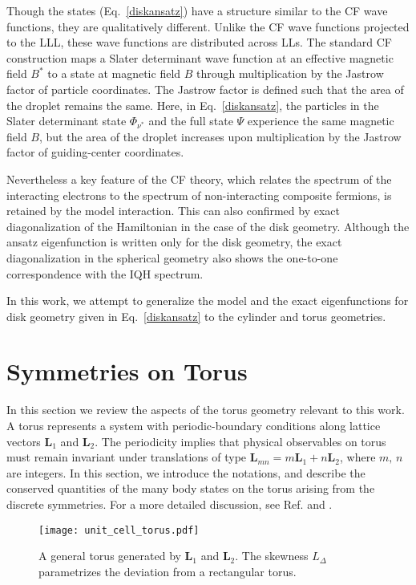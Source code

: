 \documentclass[prb,aps,epsfig,longbibliography,twocolumn]{revtex4-1}
\newcommand{\bsym}[1]{\boldsymbol{#1}}
\begin{document}
Though the states (Eq.~\ref{diskansatz}) have a structure similar to the CF wave functions, they are qualitatively different. Unlike the CF wave functions projected to the LLL, these wave functions are distributed across LLs. The standard CF construction maps a Slater determinant wave function at an effective magnetic field $B^*$ to a state at magnetic field $B$ through multiplication by the Jastrow factor of particle coordinates. The Jastrow factor is defined such that the area of the droplet remains the same. Here, in Eq.~\ref{diskansatz}, the particles in the Slater determinant state $\Phi_{\nu^*}$ and the full state $\Psi$ experience the same magnetic field $B$, but the area of the droplet increases upon multiplication by the Jastrow factor of guiding-center coordinates. 

Nevertheless a key feature of the CF theory, which relates the spectrum of the interacting electrons to the spectrum of non-interacting composite fermions, is retained by the model interaction. This can also confirmed by exact diagonalization of the Hamiltonian in the case of the disk geometry. Although the ansatz eigenfunction is written only for the disk geometry, the exact diagonalization in the spherical geometry also shows the one-to-one correspondence with the IQH spectrum. 

In this work, we attempt to generalize the model and the exact eigenfunctions for disk geometry given in Eq.~\eqref{diskansatz} to the cylinder and torus geometries. 

\section{Symmetries on Torus} \label{SecSymTorus}
In this section we review the aspects of the torus geometry relevant to this work.
A torus represents a system with periodic-boundary conditions along lattice vectors $\bsym{L}_1$ and $\bsym{L}_2$. The periodicity implies that physical observables on torus must remain invariant under translations of type $\bsym{L}_{mn}= m\bsym{L}_1 + n\bsym{L}_2$, where $m,\,n$ are integers. 
In this section, we introduce the notations, and describe the conserved quantities of the many body states on the torus arising from the discrete symmetries. For a more detailed discussion, see Ref.  and .
\begin{figure}[h]
\texttt{[image: unit\_cell\_torus.pdf]}
\caption{
A general torus generated by $\bsym{L}_1$ and $\bsym{L}_2$. The skewness $L_{\Delta}$ parametrizes the deviation from a rectangular torus.
}
\label{fig::2.1}
\end{figure}
\end{document}
